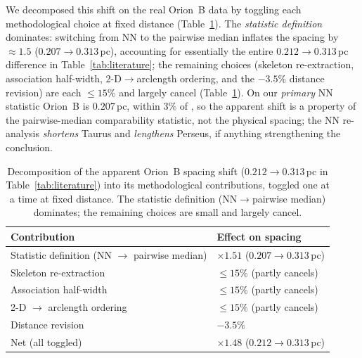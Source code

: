 \documentclass[usenatbib,twoside,twocolumn]{mnras}
\begin{document}
We decomposed this shift on the real Orion~B data by toggling each methodological choice at fixed distance (Table~\ref{tab:decomp}). The \emph{statistic definition} dominates: switching from NN to the pairwise median inflates the spacing by $\approx1.5$ ($0.207\to0.313$\,pc), accounting for essentially the entire $0.212\to0.313$\,pc difference in Table~\ref{tab:literature}; the remaining choices (skeleton re-extraction, association half-width, 2-D$\to$arclength ordering, and the $-3.5\%$ distance revision) are each $\le15\%$ and largely cancel (Table~\ref{tab:decomp}). On our \emph{primary} NN statistic Orion~B is $0.207$\,pc, within $3\%$ of \citet{Konyves2020}, so the apparent shift is a property of the pairwise-median comparability statistic, not the physical spacing; the NN re-analysis \emph{shortens} Taurus and \emph{lengthens} Perseus, if anything strengthening the conclusion.

\begin{table}
\caption{Decomposition of the apparent Orion~B spacing shift ($0.212\to0.313$\,pc in Table~\ref{tab:literature}) into its methodological contributions, toggled one at a time at fixed distance. The statistic definition (NN$\to$pairwise median) dominates; the remaining choices are small and largely cancel.}
\label{tab:decomp}
\footnotesize
\setlength{\tabcolsep}{4pt}
\begin{tabular}{@{}p{4.3cm}l@{}}
\toprule
Contribution & Effect on spacing \\
\midrule
Statistic definition (NN $\to$ pairwise median) & $\times1.51$ ($0.207\!\to\!0.313$\,pc) \\
Skeleton re-extraction & $\le15\%$ (partly cancels) \\
Association half-width & $\le15\%$ (partly cancels) \\
2-D $\to$ arclength ordering & $\le15\%$ (partly cancels) \\
Distance revision & $-3.5\%$ \\
\midrule
Net (all toggled) & $\times1.48$ ($0.212\!\to\!0.313$\,pc) \\
\bottomrule
\end{tabular}
\end{table}
\end{document}
